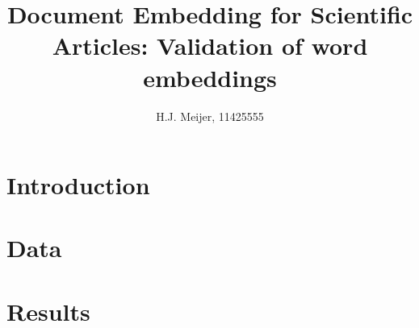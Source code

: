 \documentclass[10pt,a4paper]{article}
\newcommand{\mainheader}[1]{\section{#1}}
\begin{document}
\begin{titlepage}
\title{Document Embedding for Scientific Articles: Validation of word embeddings}
\author{H.J. Meijer, 11425555}
\clearpage\maketitle\thispagestyle{empty}

\end{titlepage}

\mainheader{Introduction}


\clearpage

\clearpage
%
\clearpage

\mainheader{Data}

\clearpage

\mainheader{Results}

\clearpage



\clearpage



\end{document}
